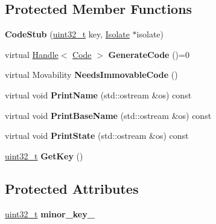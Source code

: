 \subsection*{Protected Member Functions}
\begin{DoxyCompactItemize}
\item 
\mbox{\label{classv8_1_1internal_1_1CodeStub_a7527e954f615542b8eefcf63fd08746e}} 
{\bfseries Code\+Stub} (\mbox{\hyperlink{classuint32__t}{uint32\+\_\+t}} key, \mbox{\hyperlink{classv8_1_1internal_1_1Isolate}{Isolate}} $\ast$isolate)
\item 
\mbox{\label{classv8_1_1internal_1_1CodeStub_af97a144d181a25b3fdc1c35585fed35e}} 
virtual \mbox{\hyperlink{classv8_1_1internal_1_1Handle}{Handle}}$<$ \mbox{\hyperlink{classv8_1_1internal_1_1Code}{Code}} $>$ {\bfseries Generate\+Code} ()=0
\item 
\mbox{\label{classv8_1_1internal_1_1CodeStub_a05fa1e71dd487f1dbb8fa71e57135338}} 
virtual Movability {\bfseries Needs\+Immovable\+Code} ()
\item 
\mbox{\label{classv8_1_1internal_1_1CodeStub_a12037fc4510bac5ae59c8109bc441ba8}} 
virtual void {\bfseries Print\+Name} (std\+::ostream \&os) const
\item 
\mbox{\label{classv8_1_1internal_1_1CodeStub_a14f85cdea1100da28ac97e67bd0aa6eb}} 
virtual void {\bfseries Print\+Base\+Name} (std\+::ostream \&os) const
\item 
\mbox{\label{classv8_1_1internal_1_1CodeStub_aeb27675ad86ee7d36c36a2be4d519132}} 
virtual void {\bfseries Print\+State} (std\+::ostream \&os) const
\item 
\mbox{\label{classv8_1_1internal_1_1CodeStub_adcce9f0c6ec471a2ef53f2561e6889c8}} 
\mbox{\hyperlink{classuint32__t}{uint32\+\_\+t}} {\bfseries Get\+Key} ()
\end{DoxyCompactItemize}
\subsection*{Protected Attributes}
\begin{DoxyCompactItemize}
\item 
\mbox{\label{classv8_1_1internal_1_1CodeStub_acd00f90e85d81d14a76ec8777bef3aa4}} 
\mbox{\hyperlink{classuint32__t}{uint32\+\_\+t}} {\bfseries minor\+\_\+key\+\_\+}
\end{DoxyCompactItemize}
